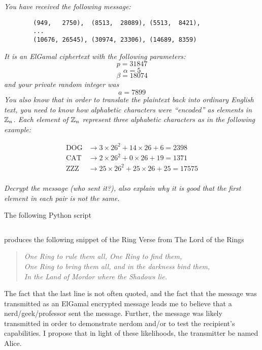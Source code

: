 \documentclass[12pt]{article}
\begin{document}
\section{} \textit{You have received the following message:}

    \begin{verbatim}
        (949,   2750),  (8513,  28089), (5513,  8421),
        ...
        (10676, 26545), (30974, 23306), (14689, 8359)
    \end{verbatim}

    \textit{It is an ElGamal ciphertext with the following parameters:}
        $$p = 31847$$
        $$\alpha = 5$$
        $$\beta = 18074$$
    \textit{and your private random integer was}
        $$a = 7899$$
    \textit{You also know that in order to translate the plaintext back into ordinary English text, you need to know how alphabetic characters were ``encoded'' as elements in $\mathbb{Z}_n$.  Each element of $\mathbb{Z}_n$ represent three alphabetic characters as in the following example:}

        \begin{align*}
            \text{DOG} &\to 3  \times 26^2 + 14 \times 26 + 6  = 2398\\
            \text{CAT} &\to 2  \times 26^2 + 0  \times 26 + 19 = 1371\\
            \text{ZZZ} &\to 25 \times 26^2 + 25 \times 26 + 25 = 17575\\
        \end{align*}

    \textit{Decrypt the message (who sent it?), also explain why it is good that the first element in each pair is not the same.}

    The following Python script

    \inputminted{python}{scripts/prob_6.py}

    produces the following snippet of the Ring Verse from The Lord of the Rings

    \begin{quote}
        \centering
        \textit{One Ring to rule them all, One Ring to find them,}\\
        \textit{One Ring to bring them all, and in the darkness bind them,}\\
        \textit{In the Land of Mordor where the Shadows lie.}\\
    \end{quote}

    The fact that the last line is not often quoted, and the fact that the message was transmitted as an ElGamal encrypted message leads me to believe that a nerd/geek/professor sent the message. Further, the message was likely transmitted in order to demonstrate nerdom and/or to test the recipient's capabilities. I propose that in light of these likelihoods, the transmitter be named Alice.
\end{document}
